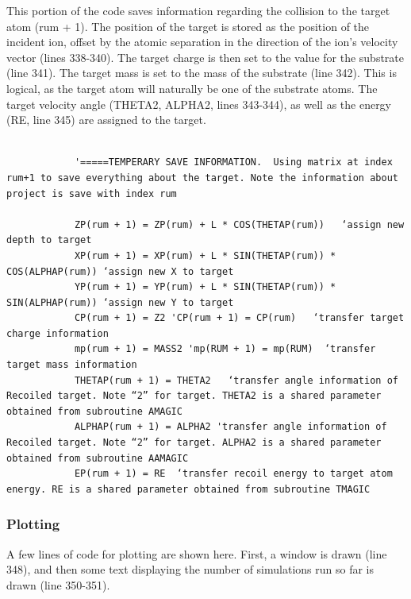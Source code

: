 \documentclass[10pt, reqno]{exam}
\begin{document}
This portion of the code saves information regarding the collision to the target atom (rum + 1). The position of the target is stored as the position of the incident ion, offset by the atomic separation in the direction of the ion's velocity vector (lines 338-340). The target charge is then set to the value for the substrate (line 341). The target mass is set to the mass of the substrate (line 342). This is logical, as the target atom will naturally be one of the substrate atoms. The target velocity angle (THETA2, ALPHA2, lines 343-344), as well as the energy (RE, line 345) are assigned to the target. \par

\begin{verbatim}   
            
            '=====TEMPERARY SAVE INFORMATION.  Using matrix at index rum+1 to save everything about the target. Note the information about project is save with index rum
    
            ZP(rum + 1) = ZP(rum) + L * COS(THETAP(rum))   ‘assign new depth to target
            XP(rum + 1) = XP(rum) + L * SIN(THETAP(rum)) * COS(ALPHAP(rum)) ‘assign new X to target 
            YP(rum + 1) = YP(rum) + L * SIN(THETAP(rum)) * SIN(ALPHAP(rum)) ‘assign new Y to target
            CP(rum + 1) = Z2 'CP(rum + 1) = CP(rum)   ‘transfer target charge information
            mp(rum + 1) = MASS2 'mp(RUM + 1) = mp(RUM)  ‘transfer target mass information
            THETAP(rum + 1) = THETA2   ‘transfer angle information of Recoiled target. Note “2” for target. THETA2 is a shared parameter obtained from subroutine AMAGIC 
            ALPHAP(rum + 1) = ALPHA2 'transfer angle information of  Recoiled target. Note “2” for target. ALPHA2 is a shared parameter obtained from subroutine AAMAGIC
            EP(rum + 1) = RE  ‘transfer recoil energy to target atom energy. RE is a shared parameter obtained from subroutine TMAGIC
\end{verbatim}

\subsubsection{Plotting}
\label{sec:ion plotting}

A few lines of code for plotting are shown here. First, a window is drawn (line 348), and then some text displaying the number of simulations run so far is drawn (line 350-351). \par
\end{document}
